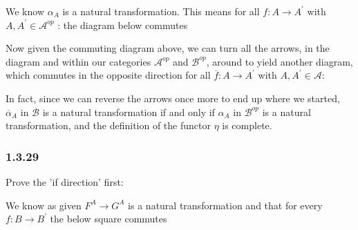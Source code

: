 \documentclass{article}
\begin{document}
We know $\alpha_{A}$ is a natural transformation. This means for all $f\colon A \rightarrow A^{\prime}$ with $A, A^{\prime} \in \mathcal{A}^{op}$  : the diagram below commutes

\begin{center}
\end{center}

Now given the commuting diagram above, we can turn all the arrows, in the diagram and within our categories $\mathcal{A}^{op}$ and $\mathcal{B}^{op}$, around to yield another diagram, which commutes in the opposite direction for all $\overline{f}\colon A \rightarrow A^{\prime}$ with $A, A^{\prime} \in \mathcal{A}$:

\begin{center}
\end{center}

In fact, since we can reverse the arrows once more to end up where we started, $\overline{\alpha}_A$ in $\mathcal{B}$ is a natural transformation if and only if $\alpha_A$ in $\mathcal{B}^{op}$ is a natural transformation, and the definition of the functor $\eta$ is complete.

\subsubsection*{1.3.29}

Prove the 'if direction' first:

We know as given $F^A \rightarrow G^A$ is a natural transformation and that for every $f\colon B \rightarrow B^{\prime}$ the below square commutes

\begin{center}
\end{center}
\end{document}
